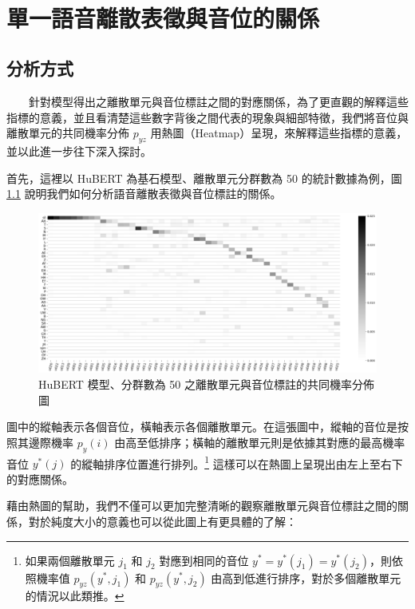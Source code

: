 \chapter{單一語音離散表徵與音位的關係}


\section{分析方式}

　　針對模型得出之離散單元與音位標註之間的對應關係，為了更直觀的解釋這些指標的意義，並且看清楚這些數字背後之間代表的現象與細部特徵，我們將音位與離散單元的共同機率分佈 \(p_{yz}\) 用熱圖（Heatmap）呈現，來解釋這些指標的意義，並以此進一步往下深入探討。

        首先，這裡以 HuBERT 為基石模型、離散單元分群數為 50 的統計數據為例，圖 \ref{fig:hubert-50-joint-byprob} 說明我們如何分析語音離散表徵與音位標註的關係。

\begin{figure}
    \centering
    \includegraphics[width=1\linewidth]{figures/hubert-50-joint-byprob.png}
    \caption{HuBERT 模型、分群數為 50 之離散單元與音位標註的共同機率分佈圖}
    \label{fig:hubert-50-joint-byprob}
\end{figure}

        圖中的縱軸表示各個音位，橫軸表示各個離散單元。在這張圖中，縱軸的音位是按照其邊際機率 \(p_y(i)\) 由高至低排序；橫軸的離散單元則是依據其對應的最高機率音位 \(y^\ast(j)\) 的縱軸排序位置進行排列。\footnote{如果兩個離散單元 \(j_1\) 和 \(j_2\) 對應到相同的音位 \(y^\ast = y^\ast(j_1) = y^\ast(j_2)\)，則依照機率值 \(p_{yz}(y^\ast, j_1)\) 和 \(p_{yz}(y^\ast, j_2)\) 由高到低進行排序，對於多個離散單元的情況以此類推。} 這樣可以在熱圖上呈現出由左上至右下的對應關係。

        藉由熱圖的幫助，我們不僅可以更加完整清晰的觀察離散單元與音位標註之間的關係，對於純度大小的意義也可以從此圖上有更具體的了解：


